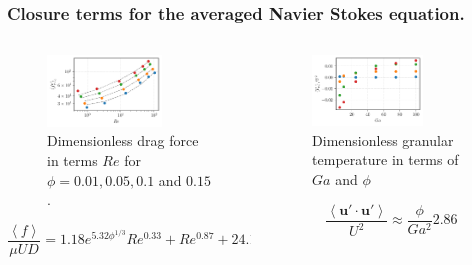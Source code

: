 \documentclass{sintefbeamer}
\newcommand{\avg}[1]{\left<#1\right>}
\begin{document}
\begin{frame}
  \frametitle{Closure terms for the averaged Navier Stokes equation.}
\begin{columns}
  \begin{column}{0.5\textwidth}
    \begin{figure}
      \includegraphics[width=0.7\textwidth]{image/HOMOGENEOUS/fCA/FH_mu_Re.pdf}
      \caption{Dimensionless drag force in terms $Re$ for $\phi = 0.01, 0.05, 0.1$ and $0.15$.}
    \end{figure}
    \begin{equation*}
      \frac{\avg{f}}{\mu UD} 
      = 1.18 e^{5.32\phi^{1/3}}  Re^{0.33}  + Re^{0.87} +24.12
    \end{equation*}
  \end{column}
  \begin{column}{0.5\textwidth}
    \begin{figure}[h!]
      \centering
      \includegraphics[width=0.7\textwidth]{image/HOMOGENEOUS/fPA/Talpha.pdf}
      \caption{Dimensionless granular temperature in terms of $Ga$ and $\phi$}
  \end{figure}
  	\begin{equation}
    \frac{\avg{\textbf{u}'\cdot \textbf{u}'}}{U^2}  
    \approx \frac{\phi}{Ga^2} 2.86 
    \label{eq:Talpha_scaling}
	\end{equation}
  \end{column}
\end{columns}

\end{frame}
\end{document}
